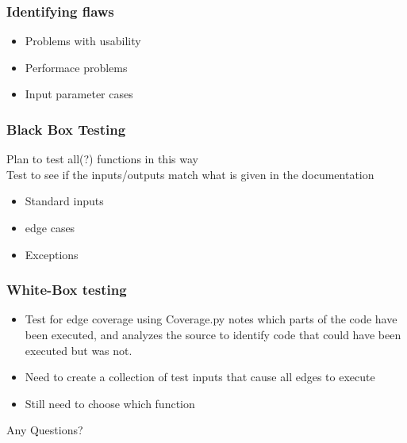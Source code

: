 \documentclass{beamer}
\begin{document}
\begin{frame}\frametitle{Identifying flaws} 
\begin{itemize}
\item Problems with usability
\item Performace problems
\item Input parameter cases
\end{itemize}
\end{frame}

\begin{frame}\frametitle{Black Box Testing} 
Plan to test all(?) functions in this way\\
Test to see if the inputs/outputs match what is given in the documentation
\begin{itemize}
\item Standard inputs
\item edge cases
\item Exceptions 

\end{itemize}
\end{frame}

\begin{frame}\frametitle{White-Box testing} 
\begin{itemize}
\item Test for edge coverage using Coverage.py
 notes which parts of the code have been executed, and analyzes the source to identify code that could have been executed but was not.
\item Need to create a collection of test inputs that cause all edges to execute
\item Still need to choose which function
\end{itemize}
\end{frame}

\begin{frame}
Any Questions?
\end{frame}
\end{document}
